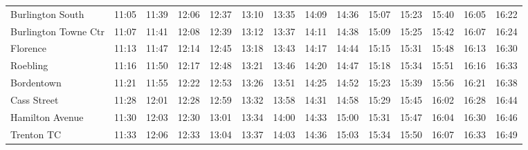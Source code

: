 \begin{center}
\begin{tabular}{@{}lrrrrrrrrrrrrr@{}}
Burlington South & 11:05 & 11:39 & 12:06 & 12:37 & 13:10 & 13:35 & 14:09 & 14:36 & 15:07 & 15:23 & 15:40 & 16:05 & 16:22 \\
Burlington Towne Ctr & 11:07 & 11:41 & 12:08 & 12:39 & 13:12 & 13:37 & 14:11 & 14:38 & 15:09 & 15:25 & 15:42 & 16:07 & 16:24 \\
Florence & 11:13 & 11:47 & 12:14 & 12:45 & 13:18 & 13:43 & 14:17 & 14:44 & 15:15 & 15:31 & 15:48 & 16:13 & 16:30 \\
Roebling & 11:16 & 11:50 & 12:17 & 12:48 & 13:21 & 13:46 & 14:20 & 14:47 & 15:18 & 15:34 & 15:51 & 16:16 & 16:33 \\
Bordentown & 11:21 & 11:55 & 12:22 & 12:53 & 13:26 & 13:51 & 14:25 & 14:52 & 15:23 & 15:39 & 15:56 & 16:21 & 16:38 \\
Cass Street & 11:28 & 12:01 & 12:28 & 12:59 & 13:32 & 13:58 & 14:31 & 14:58 & 15:29 & 15:45 & 16:02 & 16:28 & 16:44 \\
Hamilton Avenue & 11:30 & 12:03 & 12:30 & 13:01 & 13:34 & 14:00 & 14:33 & 15:00 & 15:31 & 15:47 & 16:04 & 16:30 & 16:46 \\
Trenton TC & 11:33 & 12:06 & 12:33 & 13:04 & 13:37 & 14:03 & 14:36 & 15:03 & 15:34 & 15:50 & 16:07 & 16:33 & 16:49 \\
\bottomrule\end{tabular}\end{center}
